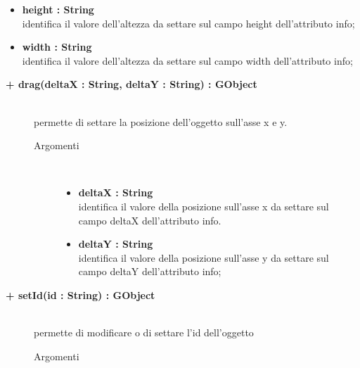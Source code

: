 \begin{description}
\begin{description}
\begin{description}
\begin{itemize}
					\item \textbf{height : String			} \hfill \\
					identifica il valore dell'altezza da settare sul campo height dell'attributo info;
					\item \textbf{width : String			} \hfill \\
					identifica il valore dell'altezza da settare sul campo width dell'attributo info;				
				\end{itemize}
		\end{description}
		
\end{description}

\begin{description}
		\item[\textbf{+ drag(deltaX : String, deltaY : String) : GObject			}] \hfill \\
			permette di settare la posizione dell'oggetto sull'asse x e y.
			
		\begin{description}
			\item[Argomenti] \hfill \\
				\begin{itemize}
				
					\item \textbf{deltaX : String			} \hfill \\
					identifica il valore della posizione sull'asse x da settare sul campo deltaX dell'attributo info.
					\item \textbf{deltaY : String			} \hfill \\
					identifica il valore della posizione sull'asse y da settare sul campo deltaY dell'attributo info;				
				\end{itemize}
		\end{description}
		
\end{description}

\begin{description}
		\item[\textbf{+ setId(id : String) : GObject			}] \hfill \\
			permette di modificare o di settare l'id dell'oggetto
			
		\begin{description}
			\item[Argomenti] \hfill \\
				\begin{itemize}
				

\end{itemize}
\end{description}
\end{description}
\end{description}

